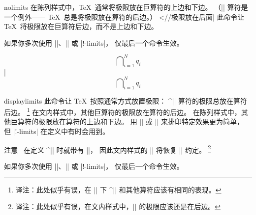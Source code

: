 \begindesc
\cts nolimits {}
\explain
在陈列样式中，\TeX\ 通常将极限放在巨算符的上边和下边。%
（|\int| 算符是一个例外—— \TeX\ 总是将极限放在算符的后边。）%
^^|\int//极限放在后面|
此命令让 \TeX\ 将极限放在巨算符后边，而不是上边和下边。

如果你多次使用 |\limits|、|\nolimits| 或 |\display!-limits|，
仅最后一个命令生效。

\example
$$\bigcap\nolimits_{i=1}^Nq_i$$
|
\dproduces
$$\bigcap\nolimits_{i=1}^Nq_i$$
\endexample
\enddesc

\begindesc
\cts displaylimits {}
\explain
此命令让 \TeX\ 按照通常方式放置极限：
\olist\compact
\li ^|\int| 算符的极限总放在算符后边。%
\footnote{译注：此处似乎有误，在 |\displaylimits| 下 ^|\int| 和其他算符应该有相同的表现。}
\li 在文内样式中，其他巨算符的极限放在算符的后边。
\li 在陈列样式中，其他巨算符的极限放在算符的上边和下边。
\endolist
用 |\limits| 或 |\nolimits| 来排印特定效果更为简单，
但 |\display!-limits| 在定义中有时会用到。

注意 \plainTeX\ 在定义 ^|\int| 时就带有 |\nolimits|，
因此文内样式的 |\int\displaylimits| 将恢复 |\limits| 约定。%
\footnote{译注：此处似乎有误，在文内样式中，|\int\displaylimits| 的极限应该还是在后边。}

如果你多次使用 |\limits|、|\nolimits| 或 |\display!-limits|，
仅最后一个命令生效。

